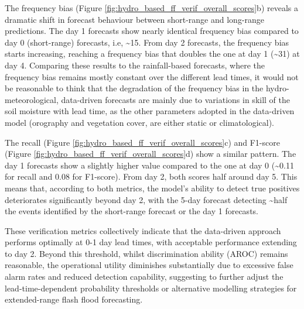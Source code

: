 The frequency bias (Figure \ref{fig:hydro_based_ff_verif_overall_scores}b) reveals a dramatic shift in forecast behaviour between short-range and long-range predictions. The day 1 forecasts show nearly identical frequency bias compared to day 0 (short-range) forecasts, i.e, \sim15. From day 2 forecasts, the frequency bias starts increasing, reaching a frequency bias that doubles the one at day 1 (\sim 31) at day 4. Comparing these results to the rainfall-based forecasts, where the frequency bias remains mostly constant over the different lead times, it would not be reasonable to think that the degradation of the frequency bias in the hydro-meteorological, data-driven forecasts are mainly due to variations in skill of the soil moisture with lead time, as the other parameters adopted in the data-driven model (orography and vegetation cover, are either static or climatological).

The recall (Figure \ref{fig:hydro_based_ff_verif_overall_scores}c) and F1-score (Figure \ref{fig:hydro_based_ff_verif_overall_scores}d) show a similar pattern. The day 1 forecasts show a slightly higher value compared to the one at day 0 (\sim 0.11 for recall and 0.08 for F1-score). From day 2, both scores half around day 5. This means that, according to both metrics, the model's ability to detect true positives deteriorates significantly beyond day 2, with the 5-day forecast detecting \sim half the events identified by the short-range forecast or the day 1 forecasts.

These verification metrics collectively indicate that the data-driven approach performs optimally at 0-1 day lead times, with acceptable performance extending to day 2. Beyond this threshold, whilst discrimination ability (AROC) remains reasonable, the operational utility diminishes substantially due to excessive false alarm rates and reduced detection capability, suggesting to further adjust the lead-time-dependent probability thresholds or alternative modelling strategies for extended-range flash flood forecasting.

